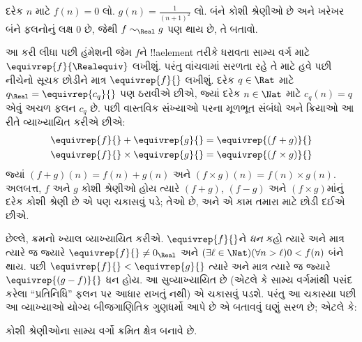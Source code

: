 \documentclass[../../../include/open-logic-section]{subfiles}
\begin{document}
\begin{prob}
દરેક $n$ માટે $f(n) = 0$ લો. $g(n) = \frac{1}{(n+1)^2}$ લો. બંને
કોશી શ્રેણીઓ છે અને ખરેખર બંને ફલનોનું લક્ષ $0$ છે, જેથી
$f \sim_\Real g$ પણ થાય છે, તે બતાવો.
\end{prob}

આ કરી લીધા પછી હંમેશની જેમ $f$ને !!a{element} તરીકે ધરાવતા સામ્ય
વર્ગ માટે $\equivrep{f}{\Realequiv}$ લખીશું. પરંતુ વાંચવામાં સરળતા
રહે તે માટે હવે પછી નીચેનો સૂચક છોડીને માત્ર $\equivrep{f}{}$ લખીશું.
દરેક $q \in \Rat$ માટે $q_{\Real} = \equivrep{c_{q}}{}$ પણ ઠરાવીએ
છીએ, જ્યાં દરેક $n \in \Nat$ માટે $c_q(n) = q$ એવું અચળ ફલન $c_{q}$
છે. પછી વાસ્તવિક સંખ્યાઓ પરના મૂળભૂત સંબંધો અને ક્રિયાઓ આ રીતે
વ્યાખ્યાયિત કરીએ છીએ:
\begin{align*}
	\equivrep{f}{} + \equivrep{g}{} &= 	\equivrep{(f + g)}{} \\
	\equivrep{f}{} \times 	\equivrep{g}{} &= \equivrep{(f \times g)}{}
\end{align*}
જ્યાં $(f + g)(n) = f(n) + g(n)$ અને $(f \times g)(n) = f(n) \times
g(n)$. અલબત્ત, $f$ અને $g$ કોશી શ્રેણીઓ હોય ત્યારે $(f + g)$,
$(f-g)$ અને $(f\times g)$માંનું દરેક કોશી શ્રેણી છે એ પણ ચકાસવું પડે;
તેઓ છે, અને એ કામ તમારા માટે છોડી દઈએ છીએ.

છેલ્લે, ક્રમનો ખ્યાલ વ્યાખ્યાયિત કરીએ. $\equivrep{f}{}$ને
\emph{ધન} કહો ત્યારે અને માત્ર ત્યારે જ જ્યારે $\equivrep{f}{}\neq
0_\Real$ અને $(\exists \ell \in \Nat)(\forall n > \ell)0 < f(n)$
બંને થાય. પછી $\equivrep{f}{} < \equivrep{g}{}$ ત્યારે અને માત્ર
ત્યારે જ જ્યારે $\equivrep{(g - f)}{}$ ધન હોય. આ સુવ્યાખ્યાયિત છે
(એટલે કે સામ્ય વર્ગમાંથી પસંદ કરેલા ``પ્રતિનિધિ'' ફલન પર આધાર
રાખતું નથી) એ ચકાસવું પડશે.
પરંતુ આ ચકાસ્યા પછી આ વ્યાખ્યાઓ યોગ્ય બીજગાણિતિક ગુણધર્મો આપે છે
એ બતાવવું ઘણું સરળ છે; એટલે કે:
\begin{thm}
કોશી શ્રેણીઓના સામ્ય વર્ગો ક્રમિત ક્ષેત્ર બનાવે છે.
\end{thm}
\end{document}
